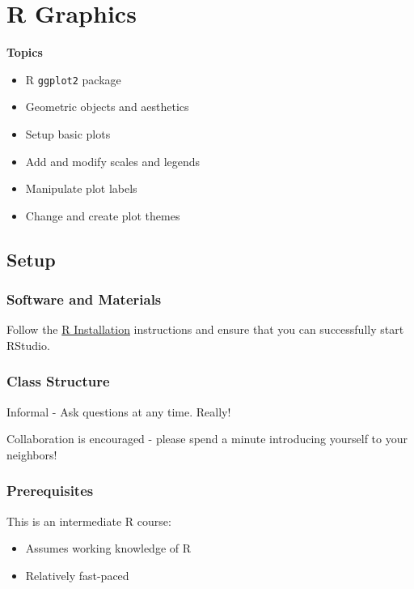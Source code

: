 \documentclass[]{book}
\providecommand{\tightlist}{%
  \setlength{\itemsep}{0pt}\setlength{\parskip}{0pt}}
\begin{document}
\hypertarget{r-graphics}{%
\chapter{R Graphics}\label{r-graphics}}

\textbf{Topics}

\begin{itemize}
\tightlist
\item
  R \texttt{ggplot2} package
\item
  Geometric objects and aesthetics
\item
  Setup basic plots
\item
  Add and modify scales and legends
\item
  Manipulate plot labels
\item
  Change and create plot themes
\end{itemize}

\hypertarget{setup-2}{%
\section{Setup}\label{setup-2}}

\hypertarget{software-and-materials-2}{%
\subsection{Software and Materials}\label{software-and-materials-2}}

Follow the \href{./Rinstall.html}{R Installation} instructions and ensure that you can successfully start RStudio.

\hypertarget{class-structure-2}{%
\subsection{Class Structure}\label{class-structure-2}}

Informal - Ask questions at any time. Really!

Collaboration is encouraged - please spend a minute introducing yourself to your neighbors!

\hypertarget{prerequisites-2}{%
\subsection{Prerequisites}\label{prerequisites-2}}

This is an intermediate R course:

\begin{itemize}
\tightlist
\item
  Assumes working knowledge of R
\item
  Relatively fast-paced
\end{itemize}
\end{document}

